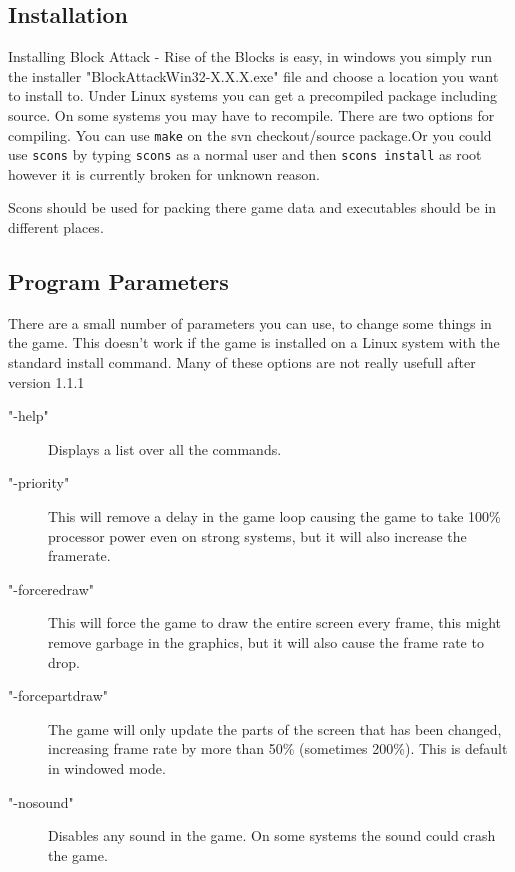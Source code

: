 \documentclass[11pt,a4paper]{article}
\begin{document}
\subsection{Installation}
Installing Block Attack - Rise of the Blocks is easy, in windows
you simply run the installer "BlockAttackWin32-X.X.X.exe" file and
choose a location you want to install to. Under Linux systems you
can get a precompiled package including source. On some systems
you may have to recompile. There are two options for compiling. You can use \verb+make+ on the svn checkout/source package.\newline Or you could use \verb+scons+ by typing \verb+scons+ as a normal user and then \verb+scons install+ as root however it is currently broken for unknown reason. \newline 

Scons should be used for packing there game data and executables should be in different places. 
\subsection{Program Parameters}
There are a small number of parameters you can use, to change some
things in the game. This doesn't work if the game is installed on a Linux system with the standard install command. Many of these options are not really usefull after version 1.1.1
\begin{description}
\item["-help"] Displays a list over all the commands.
\item["-priority"] This will remove a delay in the game loop
causing the game to take 100\% processor power even on strong
systems, but it will also increase the framerate.
\item["-forceredraw"] This will force the game to draw the entire
screen every frame, this might remove garbage in the graphics, but
it will also cause the frame rate to drop. \item["-forcepartdraw"]
The game will only update the parts of the screen that has been
changed, increasing frame rate by more than 50\% (sometimes 200\%).
This is default in windowed mode.
\item["-nosound"] Disables any sound in the game. On some systems the sound could crash the game.
\end{description}
\end{document}
